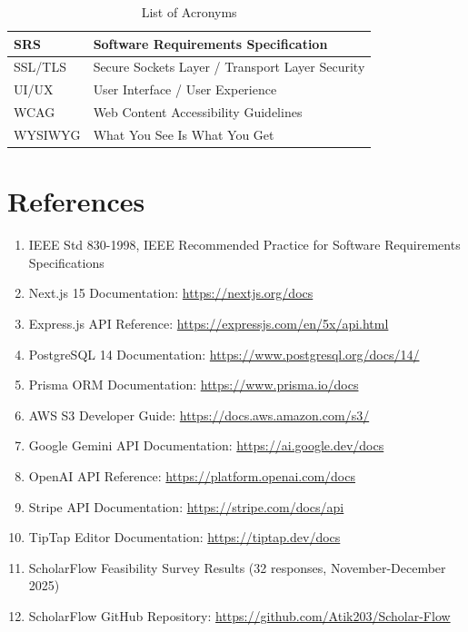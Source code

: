 \begin{table}[H]
\begin{tabularx}{\textwidth}{|l|X|}
        \hline
        SRS              & Software Requirements Specification             \\
        \hline
        SSL/TLS          & Secure Sockets Layer / Transport Layer Security \\
        \hline
        UI/UX            & User Interface / User Experience                \\
        \hline
        WCAG             & Web Content Accessibility Guidelines            \\
        \hline
        WYSIWYG          & What You See Is What You Get                    \\
        \hline
    \end{tabularx}
    \caption{List of Acronyms}
    \label{table:acronyms}
\end{table}

\section{References}

\begin{enumerate}
    \item IEEE Std 830-1998, IEEE Recommended Practice for Software Requirements Specifications
    \item Next.js 15 Documentation: \url{https://nextjs.org/docs}
    \item Express.js API Reference: \url{https://expressjs.com/en/5x/api.html}
    \item PostgreSQL 14 Documentation: \url{https://www.postgresql.org/docs/14/}
    \item Prisma ORM Documentation: \url{https://www.prisma.io/docs}
    \item AWS S3 Developer Guide: \url{https://docs.aws.amazon.com/s3/}
    \item Google Gemini API Documentation: \url{https://ai.google.dev/docs}
    \item OpenAI API Reference: \url{https://platform.openai.com/docs}
    \item Stripe API Documentation: \url{https://stripe.com/docs/api}
    \item TipTap Editor Documentation: \url{https://tiptap.dev/docs}
    \item ScholarFlow Feasibility Survey Results (32 responses, November-December 2025)
    \item ScholarFlow GitHub Repository: \url{https://github.com/Atik203/Scholar-Flow}
\end{enumerate}

